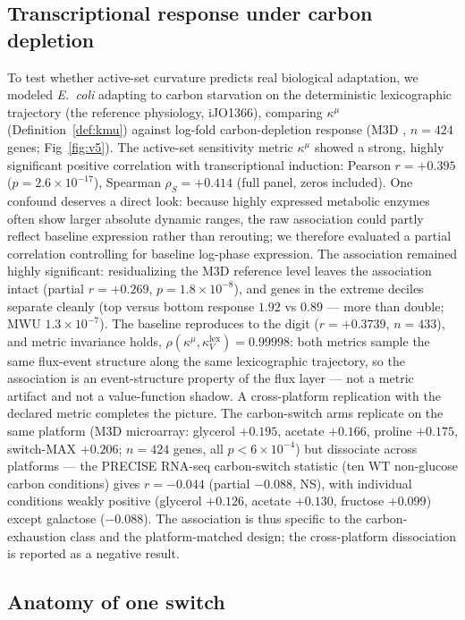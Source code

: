 \documentclass[11pt,a4paper]{article}
\theoremstyle{plain}
\theoremstyle{definition}
\theoremstyle{remark}
\newcommand{\kk}{\kappa_{\!V}}
\newcommand{\kmu}{\kappa^{\mu}}
\begin{document}
\subsection{Transcriptional response under carbon depletion}
\label{sec:v5}
To test whether active-set curvature predicts real biological
adaptation, we modeled \emph{E.~coli} adapting to carbon starvation on
the deterministic lexicographic trajectory (the reference physiology,
iJO1366), comparing $\kmu$ (Definition~\ref{def:kmu}) against
log-fold carbon-depletion response (M3D \citep{faith2008}, $n = 424$
genes; Fig~\ref{fig:v5}). The active-set sensitivity metric $\kmu$
showed a strong, highly significant positive correlation with
transcriptional induction: Pearson
$r = +0.395$ ($p = 2.6 \times 10^{-17}$), Spearman
$\rho_S = +0.414$ (full panel, zeros included). One confound
deserves a direct look: because highly expressed metabolic enzymes
often show larger absolute dynamic ranges, the raw association could
partly reflect baseline expression rather than rerouting; we
therefore evaluated a partial correlation controlling for baseline
log-phase expression. The association remained highly significant:
residualizing the M3D reference level leaves the association intact
(partial $r = +0.269$, $p = 1.8 \times 10^{-8}$), and genes in the
extreme deciles separate cleanly (top versus bottom response $1.92$
vs $0.89$ --- more than double; MWU $1.3 \times 10^{-7}$). The baseline reproduces to the
digit ($r = +0.3739$, $n = 433$), and metric invariance holds,
$\rho(\kmu, \kk^{\mathrm{lex}}) = 0.99998$: both metrics sample the
same flux-event structure along the same lexicographic trajectory,
so the association is an event-structure property of the flux layer ---
not a metric artifact and not a value-function shadow. A
cross-platform replication with the declared metric completes the
picture. The carbon-switch arms replicate on the same platform (M3D
microarray: glycerol $+0.195$, acetate $+0.166$, proline $+0.175$,
switch-MAX $+0.206$; $n = 424$ genes, all $p < 6 \times 10^{-4}$)
but dissociate across platforms --- the PRECISE RNA-seq
carbon-switch statistic (ten WT non-glucose carbon conditions)
gives $r = -0.044$ (partial $-0.088$, NS), with individual
conditions weakly positive (glycerol $+0.126$, acetate $+0.130$,
fructose $+0.099$) except galactose ($-0.088$). The association is
thus specific to the carbon-exhaustion class and the platform-matched
design; the cross-platform dissociation is reported as a negative
result.

\subsection{Anatomy of one switch}\label{sec:anatomy}
\end{document}
